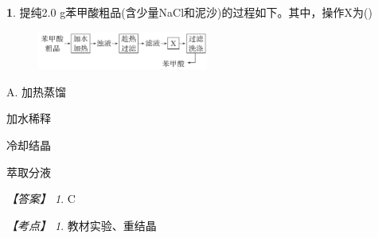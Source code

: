 \documentclass[UTF8, 10pt, a4paper, oneside]{ctexart}
\newcommand{\fs}[1]{{\fangsong #1}}%
\theoremstyle{definition}
\newtheorem{subexercise}{}[exercise]%
\theoremstyle{remark}
\newtheorem*{answer}{【答案】}
\newtheorem*{point}{【考点】}      %
\theoremstyle{plain}
\begin{document}
\begin{subexercise}
    \fs{[2024·广东卷]}提纯2.0 g苯甲酸粗品(含少量NaCl和泥沙)的过程如下。其中，操作X为\quad(\quad)
    \begin{figure}[ht!]
        \centering
        \includegraphics[width=0.5\textwidth, keepaspectratio]{assists/5.3.1.png}
    \end{figure}\vspace{-1.5em}
    \begin{center}
        \begin{inparaenum}[\qquad A. ]
            \item[\setcounter{enumi}{1}A. ] 加热蒸馏
            \item 加水稀释
            \item 冷却结晶
            \item 萃取分液
        \end{inparaenum}
    \end{center}
    \begin{answer}
        C
    \end{answer}
    \begin{point}
        教材实验、重结晶
    \end{point}
\end{subexercise}
\newpage
\end{document}
